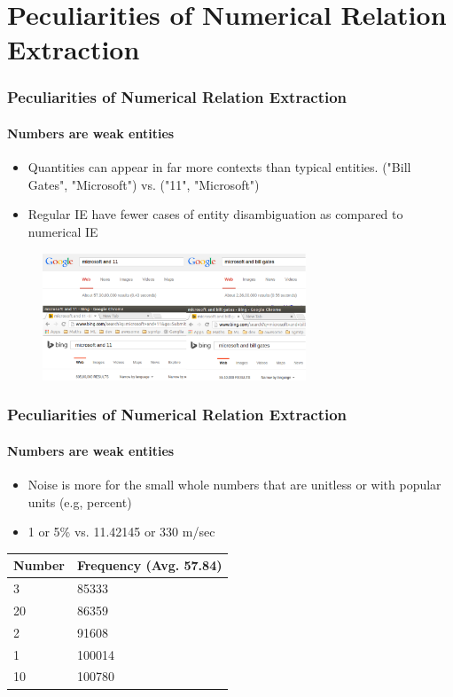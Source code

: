 \documentclass{beamer}
\begin{document}
\section{Peculiarities of Numerical Relation Extraction}
\begin{frame}
\frametitle{Peculiarities of Numerical Relation Extraction}
\framesubtitle{Numbers are weak entities}
\begin{itemize}
\item Quantities can appear in far more contexts than typical entities. ("Bill Gates", "Microsoft") vs. ("11", "Microsoft")
\item Regular IE have fewer cases of entity disambiguation as compared to numerical IE
\end{itemize}

\begin{figure}
\includegraphics[width=0.7\textwidth]{images/popularitynumbers.eps}
\end{figure}

\end{frame}
    
\begin{frame}
\frametitle{Peculiarities of Numerical Relation Extraction}
\framesubtitle{Numbers are weak entities}
\begin{itemize}
 \item Noise is more for the small whole numbers that are unit\-less or with popular units (e.g, percent)
 \item 1 or 5\% vs. 11.42145 or 330 m/sec
\end{itemize}

\begin{center}
\begin{tabular}{l|l}
Number & Frequency (Avg. 57.84)\\ \hline
3 & 85333\\
20 & 86359\\
2 & 91608\\
1 & 100014\\
10 & 100780
\end{tabular}
\end{center}
\end{frame}
\end{document}
